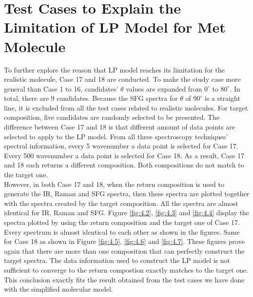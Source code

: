 \section{Test Cases to Explain the Limitation of LP Model for Met Molecule}

To further explore the reason that LP model reaches its limitation for the realistic molecule, Case 17 and 18 are conducted. To make the study case more general than Case 1 to 16, candidates' $\theta$ values are expanded from $0^{\circ}$ to $80^{\circ}$. In total, there are $9$ candidates. Because the SFG spectra for $\theta$ of $90^{\circ}$ is a straight line, it is excluded from all the test cases related to realistic molecules. For target composition, five candidates are randomly selected to be presented. The difference between Case 17 and 18 is that different amount of data points are selected to apply to the LP model. From all three spectroscopy techniques' spectral information, every 5 wavenumber a data point is selected for Case 17. Every 500 wavenumber a data point is selected for Case 18. As a result, Case 17 and 18 each returns a different composition. Both compositions do not match to the target one. \\

However, in both Case 17 and 18, when the return composition is used to generate the IR, Raman and SFG spectra, then these spectra are plotted together with the spectra created by the target composition. All the spectra are almost identical for IR, Raman and SFG. Figure \ref{fig:4.2}, \ref{fig:4.3} and \ref{fig:4.4} display the spectra plotted by using the return composition and the target one of Case 17. Every spectrum is almost identical to each other as shown in the figures. Same for Case 18 as shown in Figure \ref{fig:4.5}, \ref{fig:4.6} and \ref{fig:4.7}. These figures prove again that there are more than one composition that can perfectly construct the target spectra. The data information used to construct the LP model is not sufficient to converge to the return compostion exactly matches to the target one. This conclusion exactly fits the result obtained from the test cases we have done with the simplified molecular model.\\

